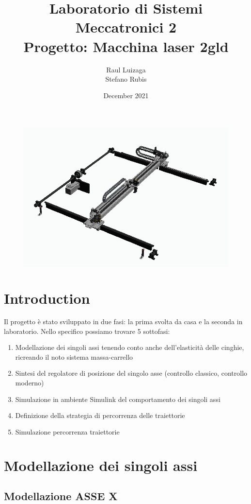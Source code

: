 \documentclass{article}
\title{Laboratorio di Sistemi Meccatronici 2 \\
       Progetto: Macchina laser 2gld}
\author{Raul Luizaga \\ Stefano Rubis}
\date{December 2021}
\begin{document}
\maketitle

\begin{figure}[H]
\centering
\includegraphics[width=.6\textwidth]{asse.png}
\end{figure}

\section{Introduction}
Il progetto è stato sviluppato in due fasi: la prima svolta da casa e la seconda in laboratorio. Nello specifico possiamo trovare 5 sottofasi: 
\begin{enumerate}
\item Modellazione dei singoli assi tenendo conto anche dell'elasticità delle cinghie, ricreando il noto sistema massa-carrello
\item  Sintesi del regolatore di posizione del singolo asse (controllo classico, controllo moderno)
\item Simulazione in ambiente Simulink del comportamento dei singoli assi
\item Definizione della strategia di percorrenza delle traiettorie
\item  Simulazione percorrenza traiettorie
\end{enumerate}

\section{Modellazione dei singoli assi}

\subsection{Modellazione ASSE X} 
\end{document}
